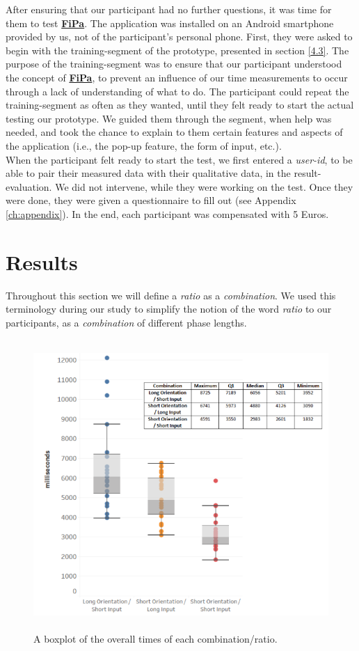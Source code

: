 After ensuring that our participant had no further questions, it was time for them to test \underline{\textbf{FiPa}}. The application was installed on an Android smartphone provided by us, not of the participant's personal phone. First, they were asked to begin with the training-segment of the prototype, presented in section \ref{4.3}. The purpose of the training-segment was to ensure that our participant understood the concept of \underline{\textbf{FiPa}}, to prevent an influence of our time measurements to occur through a lack of understanding of what to do. The participant could repeat the training-segment as often as they wanted, until they felt ready to start the actual testing our prototype. We guided them through the segment, when help was needed, and took the chance to explain to them certain features and aspects of the application (i.e., the pop-up feature, the form of input, etc.). \\

When the participant felt ready to start the test, we first entered a \textit{user-id}, to be able to pair their measured data with their qualitative data, in the result-evaluation. We did not intervene, while they were working on the test. Once they were done, they were given a questionnaire to fill out (see Appendix \ref{ch:appendix}). In the end, each participant was compensated with 5 Euros.



\section{Results} \label{5.4}

Throughout this section we will define a \textit{ratio} as a \textit{combination}. We used this terminology during our study to simplify the notion of the word \textit{ratio} to our participants, as a \textit{combination} of different phase lengths.

\begin{figure}[t!]
\centering
\includegraphics[width=13cm, height=11cm]{Chapters/graphics/Combinations.png}
\caption{A boxplot of the overall times of each combination/ratio.}
\label{fig:combination}
\end{figure}

